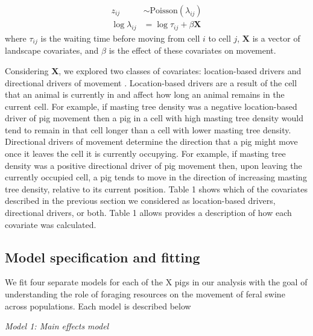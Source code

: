 \documentclass[a4paper]{article}
\begin{document}
\begin{align}
  z_{ij} &\sim \text{Poisson}(\lambda_{ij}) \\
  \log \lambda_{ij} &= \log{\tau_{ij}} + \beta \mathbf{X}
\end{align}
where $\tau_{ij}$ is the waiting time before moving from cell $i$ to cell $j$, $\mathbf{X}$ is a vector of landscape covariates, and $\beta$ is the effect of these covariates on movement.  

Considering $\mathbf{X}$, we explored two classes of covariates: location-based drivers and directional drivers of movement \citep{Hanks2015}.  Location-based drivers are a result of the cell that an animal is currently in and affect how long an animal remains in the current cell.  For example, if masting tree density was a negative location-based driver of pig movement then a pig in a cell with high masting tree density would tend to remain in that cell longer than a cell with lower masting tree density. Directional drivers of movement determine the direction that a pig might move once it leaves the cell it is currently occupying.  For example, if masting tree density was a positive directional driver of pig movement then, upon leaving the currently occupied cell, a pig tends to move in the direction of increasing masting tree density, relative to its current position. Table 1 shows which of the covariates described in the previous section we considered as location-based drivers, directional drivers, or both.  Table 1 allows provides a description of how each covariate was calculated.

\subsection*{Model specification and fitting}

We fit four separate models for each of the X pigs in our analysis with the goal of understanding the role of foraging resources on the movement of feral swine across populations.  Each model is described below

\bigskip
\noindent
\emph{Model 1: Main effects model}
\end{document}
